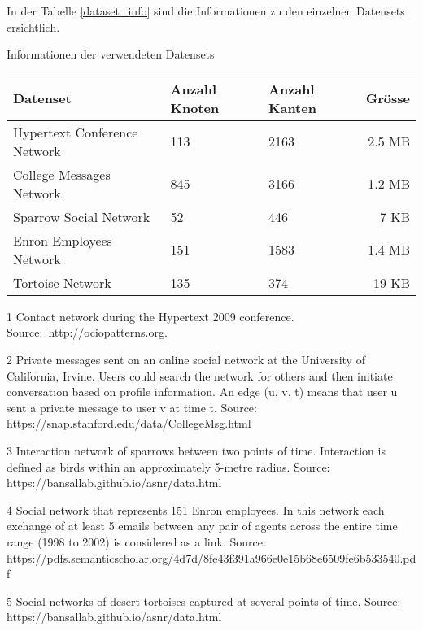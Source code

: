 In der Tabelle \ref{dataset_info} sind die Informationen zu den einzelnen Datensets ersichtlich.

\begin{threeparttable}
    \centering
    \label{dataset_info}
    \caption{Informationen der verwendeten Datensets}
    \begin{tabular}{@{}lllr@{}}
        \toprule
        Datenset                        & Anzahl Knoten & Anzahl Kanten & Grösse \\ \midrule
        Hypertext Conference Network\tnote{1}                 & 113     & 2163 & 2.5 MB   \\
        College Messages Network\tnote{2} & 845    & 3166 & 1.2 MB     \\
        Sparrow Social Network\tnote{3}                 & 52     & 446 & 7 KB   \\
        Enron Employees Network\tnote{4}                 & 151     & 1583 & 1.4 MB   \\
        Tortoise Network\tnote{5}                       & 135   & 374 & 19 KB   \\ \bottomrule
    \end{tabular}
    \begin{tablenotes}[\flushleft]
        \footnotesize
        \item[1] Contact network during the Hypertext 2009 conference. Source: http://ociopatterns.org.
        \item[2] Private messages sent on an online social network at the University of California, Irvine. Users could search the network for others and then initiate conversation based on profile information. An edge (u, v, t) means that user u sent a private message to user v at time t. Source: https://snap.stanford.edu/data/CollegeMsg.html
        \item[3] Interaction network of sparrows between two points of time. Interaction is defined as birds within an approximately 5-metre radius. Source: https://bansallab.github.io/asnr/data.html
        \item[4] Social network that represents 151 Enron employees. In this network each exchange of at least 5 emails between any pair of agents across the entire time range (1998 to 2002) is considered as a link. Source: https://pdfs.semanticscholar.org/4d7d/8fe43f391a966e0e15b68e6509fe6b533540.pdf
        \item[5] Social networks of desert tortoises captured at several points of time. Source: https://bansallab.github.io/asnr/data.html
    \end{tablenotes}
\end{threeparttable}


